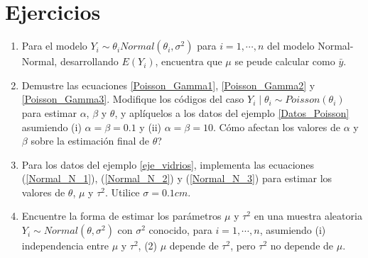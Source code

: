 \documentclass[10pt,openright]{book}\usepackage[]{graphicx}\usepackage[]{color}
\begin{document}
\section{Ejercicios}
\begin{enumerate}
\item Para el modelo $Y_i\sim\theta_i Normal(\theta_i,\sigma^2)$ para $i=1,\cdots,n$ del modelo Normal-Normal, desarrollando $E(Y_i)$, encuentra que $\mu$ se peude calcular como $\bar{y}$.
\item Demustre las ecuaciones \ref{Poisson_Gamma1}, \ref{Poisson_Gamma2} y \ref{Poisson_Gamma3}. Modifique los c\'odigos del caso $Y_i\mid\theta_i\sim Poisson(\theta_i)$ para estimar $\alpha$, $\beta$ y $\theta$, y apl\'iquelos a los datos del ejemplo \ref{Datos_Poisson} asumiendo (i) $\alpha=\beta=0.1$ y (ii) $\alpha=\beta=10$. C\'omo afectan los valores de $\alpha$ y $\beta$ sobre la estimaci\'on final de $\theta$?
\item Para los datos del ejemplo \ref{eje_vidrios}, implementa las ecuaciones (\ref{Normal_N_1}), (\ref{Normal_N_2}) y (\ref{Normal_N_3}) para estimar los valores de $\theta$, $\mu$ y $\tau^2$. Utilice $\sigma=0.1cm$.
\item Encuentre la forma de estimar los par\'ametros $\mu$ y $\tau^2$ en una muestra aleatoria $Y_i\sim Normal(\theta,\sigma^2)$ con $\sigma^2$ conocido, para $i=1,\cdots,n$, asumiendo (i) independencia entre $\mu$ y $\tau^2$, (2) $\mu$ depende de $\tau^2$, pero $\tau^2$ no depende de $\mu$.
\end{enumerate}
    
    \listoffigures
    \listoftables
    \printindex
  
\end{document}
